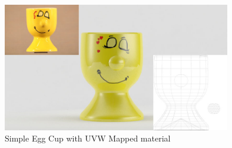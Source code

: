 \begin{figure}[hb]
	\centering
		\includegraphics[width=10cm]{img/eggcup.jpg}
		\caption{Simple Egg Cup with UVW Mapped material}
	\label{fig:Egg Cup}
\end{figure}

\vspace{0.5cm}



\vspace{0.5cm}




